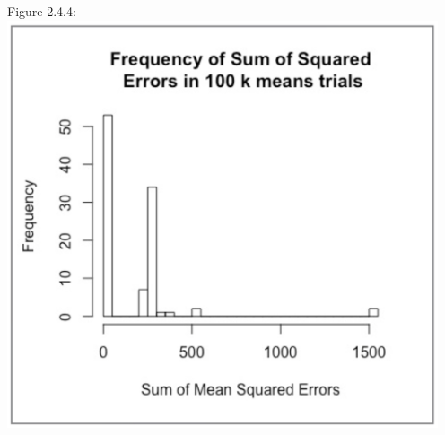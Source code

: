\documentclass[12pt]{article}
\begin{document}
  Figure 2.4.4:\\
  \includegraphics[width=5in]{plots/km_plot4.jpeg}\\
\end{document}
